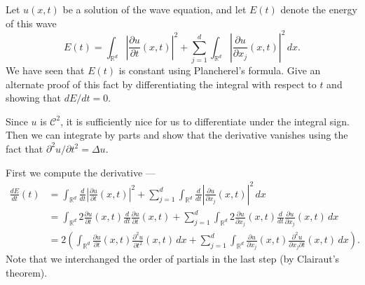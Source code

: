 \documentclass[12 pt, letterpaper]{hmcpset}
\begin{document}
\begin{problem}[S \& S \S 6.6 \#10]
	Let $u(x, t)$ be a solution of the wave equation, and let $E(t)$ denote the energy of this wave
	\[
		E(t) = \int_{\mathbb{R}^{d}} \left \lvert \frac{\partial u}{\partial t}(x, t) \right \rvert^{2} + \sum_{j = 1}^{d} \int_{\mathbb{R}^{d}} \left \lvert \frac{\partial u}{\partial x_{j}}(x, t) \right \rvert^{2} \, dx.
	\]
	We have seen that $E(t)$ is constant using Plancherel's formula. Give an alternate proof of this fact by differentiating the integral with respect to $t$ and showing that $dE / dt = 0$.
\end{problem}

\begin{solution}
	Since $u$ is $\mathcal{C}^{2}$, it is sufficiently nice for us to differentiate under the integral sign. Then we can integrate by parts and show that the derivative vanishes using the fact that $\partial^{2} u / \partial t^{2} = \Delta u$.

	First we compute the derivative ---
	\begin{align*}
		\frac{d E}{d t}(t) & = \int_{\mathbb{R}^{d}}  \frac{d }{d t} \left \lvert  \frac{\partial u}{\partial t}(x, t) \right \rvert^{2} + \sum_{j = 1}^{d} \int_{\mathbb{R}^{d}} \frac{d }{d t} \left \lvert \frac{\partial u}{\partial x_{j}}(x, t) \right \rvert^{2} \, dx \\
				   & = \int_{\mathbb{R}^{d}} 2 \frac{\partial u}{\partial t}(x, t) \frac{d }{d t} \frac{\partial u}{\partial t}(x, t) + \sum_{j = 1}^{d} \int_{\mathbb{R}^{d}} 2 \frac{\partial u}{\partial x_{j}}(x, t) \frac{d }{d t} \frac{\partial u}{\partial x_{j}}(x, t) \, dx \\
				   & = 2 \left ( \int_{\mathbb{R}^{d}} \frac{\partial u}{\partial t}(x, t) \frac{\partial^{2} u}{\partial t^{2}}(x, t) \, dx + \sum_{j = 1}^{d} \int_{\mathbb{R}^{d}} \frac{\partial u}{\partial x_{j}}(x, t) \frac{\partial^{2} u}{\partial x_{j} \partial t}(x, t) \, dx \right ).
	\end{align*}
	Note that we interchanged the order of partials in the last step (by Clairaut's theorem).


\end{solution}
\end{document}
